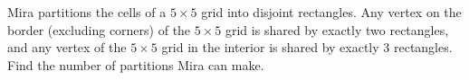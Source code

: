 Mira partitions the cells of a $5\times 5$ grid into disjoint rectangles. Any vertex on the border (excluding corners) of the $5\times 5$ grid is shared by exactly two rectangles, and any vertex of the $5\times 5$ grid in the interior is shared by exactly $3$ rectangles. Find the number of partitions Mira can make.
